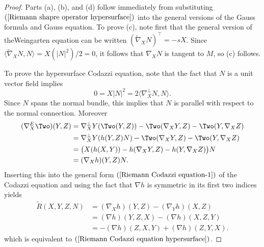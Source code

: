 \begin{proof}
Parts (a), (b), and (d) follow immediately from substituting $(\ref{Riemann shapre operator hypersurface})$ into the general versions of the Gauss formula and 
Gauss equation. To prove (c), note first that the general version of theWeingarten equation can be written $(\widetilde{\nabla}_XN)^{\top}=-sX$. Since 
$\langle\widetilde{\nabla}_XN,N\rangle=X(|N|^2)/2=0$, it follows  that $\nabla_XN$ is tangent to $M$, so (c) follows.\par
To prove the hypersurface Codazzi equation, note that the fact that $N$ is a unit vector field implies
\[0=X|N|^2=2\langle\nabla^{\bot}_XN,N\rangle.\]
Since $N$ spans the normal bundle, this implies that $N$ is parallel with respect to the normal connection. Moreover
\begin{align*}
(\nabla^E_X\Two)(Y,Z)&=\nabla^{\bot}_XY(\Two(Y,Z))-\Two(\nabla_XY,Z)-\Two(Y,\nabla_XZ)\\
&=\nabla^{\bot}_XY(h(Y,Z)N)-\Two(\nabla_XY,Z)-\Two(Y,\nabla_XZ)\\
&=\big(X(h(X,Y))-h(\nabla_XY,Z)-h(Y,\nabla_XZ)\big)N\\
&=(\nabla_Xh)(Y,Z)N.
\end{align*}
Inserting this into the general form $(\ref{Riemann Codazzi equation-1})$ of the Codazzi equation and using the fact that $\nabla h$ is symmetric in its first two indices 
yields
\begin{align*}
\tilde{R}(X,Y,Z,N)&=(\nabla_Xh)(Y,Z)-(\nabla_Yh)(X,Z)\\
&=(\nabla h)(Y,Z,X)-(\nabla h)(X,Z,Y)\\
&=-(\nabla h)(Z,X,Y)+(\nabla h)(Z,Y,X).
\end{align*}
which is equivalent to $(\ref{Riemann Codazzi equation hypersurface})$.
\end{proof}
